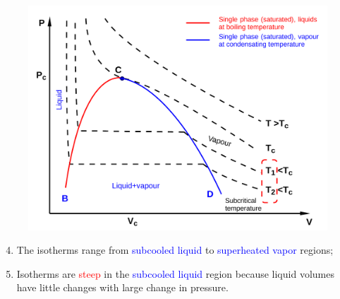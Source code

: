 \documentclass[10pt,compress]{beamer}
\begin{document}
\begin{frame}
\begin{columns}
\begin{column}[l]{0.5\linewidth}
{\begin{figure}
\begin{center}
          \includegraphics[width=\columnwidth,clip]{./Pics/PV_Diagram2}
        \end{center}
      \end{figure}}
      \begin{enumerate}\setcounter{enumi}{3}
        \item<3-> The isotherms range from \textcolor{blue}{subcooled liquid} to \textcolor{blue}{superheated vapor} regions; 
        \item<3-> Isotherms are \textcolor{red}{steep} in the \textcolor{blue}{subcooled liquid}  region because liquid volumes have little changes with large change in pressure.
      \end{enumerate}
    \end{column}
  \end{columns}
\end{frame}
\normalsize
\end{document}
